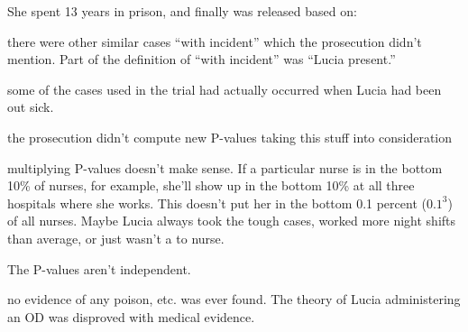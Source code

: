 \documentclass[landscape]{exam}
\begin{document}
  She spent 13 years in prison, and finally was released based on:
  \begin{itemize*}

    \item there were other similar cases ``with incident'' which the prosecution
      didn't mention. Part of the definition of ``with incident'' was ``Lucia
      present.''

    \item some of the cases used in the trial had actually occurred when Lucia
      had been out sick.

    \item the prosecution didn't compute new P-values taking this stuff into
      consideration

    \item multiplying P-values doesn't make sense. If a particular nurse is in
      the bottom 10\% of nurses, for example, she'll show up in the bottom 10\%
      at all three hospitals where she works. This doesn't put her in the bottom
      0.1 percent ($0.1^3$) of all nurses. Maybe Lucia always took the tough
      cases, worked more night shifts than average, or just wasn't a to nurse.

      The P-values aren't independent.

    \item no evidence of any poison, etc. was ever found. The theory of Lucia
      administering an OD was disproved with medical evidence. 
  \end{itemize*}
\end{document}
